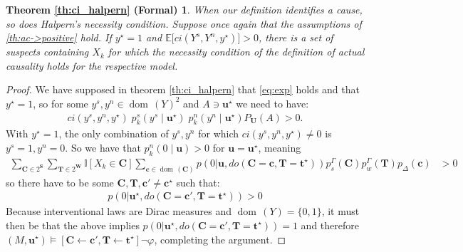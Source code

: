 \documentclass[anon,12pt]{clear2026} %
\newtheorem*{theoremcihalpern}{Theorem \ref{th:ci_halpern} (Formal)}
\newcommand{\dom}{\operatorname{dom}\,}
\begin{document}
\begin{theoremcihalpern}
When our definition identifies a cause, so does Halpern's necessity condition. Suppose once again that the assumptions of \cref{th:ac->positive} hold. If $y^\star = 1$ and $\mathbb{E}\big[ci(Y^s, Y^n, y^\star) \big] >0$, there is a set of suspects containing $X_k$ for which the necessity condition of the definition of actual causality holds for the respective model.
\end{theoremcihalpern}
\begin{proof}
We have supposed in theorem \ref{th:ci_halpern} that \eqref{eq:exp} holds and that $y^\star = 1$, so for some $y^s, y^n \in \dom (Y)^2$ and $A\ni \mathbf{u}^\star$ we need to have:
\begin{align*}
ci(y^s, y^n, y^\star) \; p^s_k(y^s \mid \mathbf{u}^\star) \; p^n_k(y^n \mid \mathbf{u}^\star) P_{\mathbf{U}}(A)  > 0.
\end{align*}
With $y^\star =1$, the only combination of $y^s, y^n$ for which $ci(y^s, y^n, y^\star) \neq 0$ is $y^s =1, y^n = 0$. So we have that $p_k^n(0\mid\mathbf{u}) > 0$ for $\mathbf{u} = \mathbf{u}^\star$, meaning
\begin{align}
    \sum_{\mathbf{C} \in 2^\mathbf{S}} \sum_{\mathbf{T}\in 2^\mathbf{W}} \mathbb{I}[X_k \in \mathbf{C}]
\sum_{\mathbf{c}\in\dom(\mathbf{C})} 
p(0 \vert \mathbf{u}, do(\mathbf{C} = \mathbf{c}, \mathbf{T} = \mathbf{t^\star}))
p^\Gamma_s(\mathbf{C}) p^\Gamma_w(\mathbf{T}) p_\Delta(\mathbf{c}) & > 0
\end{align}
\noindent so there have to be some $\mathbf{C}, \mathbf{T}, \mathbf{c}'\ne \mathbf{c}^\star$ such that:
\begin{align}
p(0 \vert \mathbf{u}^\star, do(\mathbf{C} = \mathbf{c'}, \mathbf{T} = \mathbf{t^\star})) > 0
\end{align}
\noindent Because interventional laws are Dirac measures and $\dom(Y) = \{0,1\}$, it must then be that the above implies $p(0 \vert \mathbf{u}^\star, do(\mathbf{C} = \mathbf{c'}, \mathbf{T} = \mathbf{t^\star})) = 1$ and therefore $(M, \mathbf{u}^\star) \vDash [\mathbf{C} \leftarrow \mathbf{c'}, \mathbf{T} \leftarrow \mathbf{t^\star}] \neg \varphi$, completing the argument.
\end{proof}
\end{document}
